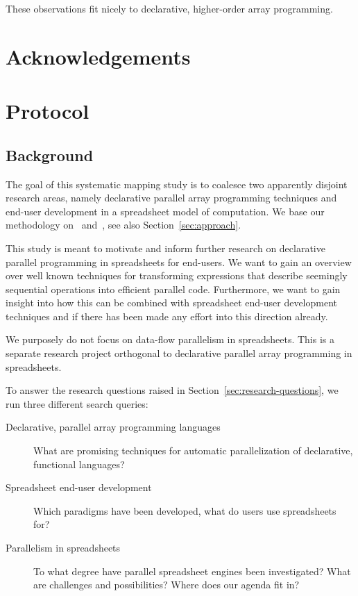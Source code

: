 \documentclass[a4paper]{article}
\begin{document}
These observations fit nicely to declarative, higher-order array
programming. 

\section*{Acknowledgements}





\appendix

\newpage{}

\section{Protocol}
\label{sec:protocol}

\subsection{Background}
\label{sec:background}

The goal of this systematic mapping study is to coalesce two
apparently disjoint research areas, namely declarative parallel array
programming techniques and end-user development in a spreadsheet model
of computation. We base our methodology on~\citet{keele2007guidelines}
and~\citet{petersen2008systematic}, see also
Section~\ref{sec:approach}.

This study is meant to motivate and inform further research on
declarative parallel programming in spreadsheets for end-users. We
want to gain an overview over well known techniques for transforming
expressions that describe seemingly sequential operations into
efficient parallel code. Furthermore, we want to gain insight into how
this can be combined with spreadsheet end-user development techniques
and if there has been made any effort into this direction
already.

We purposely do not focus on data-flow parallelism in
spreadsheets. This is a separate research project orthogonal to
declarative parallel array programming in spreadsheets.

To answer the research questions raised in
Section~\ref{sec:research-questions}, we run three different search
queries:

\begin{description}
\item[Declarative, parallel array programming languages] What are
  promising techniques for automatic parallelization of declarative,
  functional languages?
\item[Spreadsheet end-user development] Which paradigms have been
  developed, what do users use spreadsheets for?
\item[Parallelism in spreadsheets] To what degree have parallel
  spreadsheet engines been investigated? What are challenges and
  possibilities? Where does our agenda fit in?
\end{description}
\end{document}
